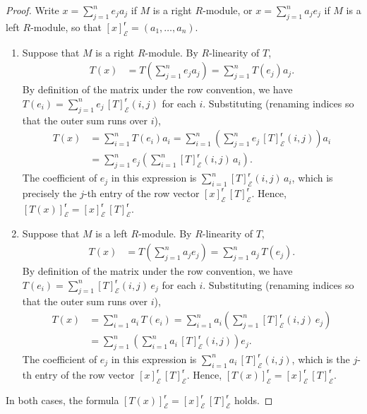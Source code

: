 \begin{proof}
    Write $x = \sum_{j=1}^n e_j a_j$ if $M$ is a right $R$-module, or $x = \sum_{j=1}^n a_j e_j$ if $M$ is a left $R$-module, so that $[x]_\mathcal{E}^{\mathsf{r}} = (a_1,\ldots,a_n)$.

    \begin{enumerate}
        \item Suppose that $M$ is a right $R$-module. By $R$-linearity of $T$,
        \begin{align*}
            T(x) &= T\!\left( \sum_{j=1}^n e_j a_j \right)
                  = \sum_{j=1}^n T(e_j) a_j.
        \end{align*}
        By definition of the matrix under the row convention, we have $T(e_i) = \sum_{j=1}^n e_j \, [T]_\mathcal{E}^{\mathsf{r}}(i,j)$ for each $i$. Substituting (renaming indices so that the outer sum runs over $i$),
        \begin{align*}
            T(x) &= \sum_{i=1}^n T(e_i) a_i
                  = \sum_{i=1}^n \left( \sum_{j=1}^n e_j \, [T]_\mathcal{E}^{\mathsf{r}}(i,j) \right) a_i \\
                &= \sum_{j=1}^n e_j \left( \sum_{i=1}^n [T]_\mathcal{E}^{\mathsf{r}}(i,j) \, a_i \right).
        \end{align*}
        The coefficient of $e_j$ in this expression is $\sum_{i=1}^n [T]_\mathcal{E}^{\mathsf{r}}(i,j) \, a_i$, which is precisely the $j$-th entry of the row vector $[x]_\mathcal{E}^{\mathsf{r}} \, [T]_\mathcal{E}^{\mathsf{r}}$. Hence, $[T(x)]_\mathcal{E}^{\mathsf{r}} = [x]_\mathcal{E}^{\mathsf{r}} \, [T]_\mathcal{E}^{\mathsf{r}}$.

        \item Suppose that $M$ is a left $R$-module. By $R$-linearity of $T$,
        \begin{align*}
            T(x) &= T\!\left( \sum_{j=1}^n a_j e_j \right)
                  = \sum_{j=1}^n a_j \, T(e_j).
        \end{align*}
        By definition of the matrix under the row convention, we have $T(e_i) = \sum_{j=1}^n [T]_\mathcal{E}^{\mathsf{r}}(i,j) \, e_j$ for each $i$. Substituting (renaming indices so that the outer sum runs over $i$),
        \begin{align*}
            T(x) &= \sum_{i=1}^n a_i \, T(e_i)
                  = \sum_{i=1}^n a_i \left( \sum_{j=1}^n [T]_\mathcal{E}^{\mathsf{r}}(i,j) \, e_j \right) \\
                &= \sum_{j=1}^n \left( \sum_{i=1}^n a_i \, [T]_\mathcal{E}^{\mathsf{r}}(i,j) \right) e_j.
        \end{align*}
        The coefficient of $e_j$ in this expression is $\sum_{i=1}^n a_i \, [T]_\mathcal{E}^{\mathsf{r}}(i,j)$, which is the $j$-th entry of the row vector $[x]_\mathcal{E}^{\mathsf{r}} \, [T]_\mathcal{E}^{\mathsf{r}}$. Hence, $[T(x)]_\mathcal{E}^{\mathsf{r}} = [x]_\mathcal{E}^{\mathsf{r}} \, [T]_\mathcal{E}^{\mathsf{r}}$.
    \end{enumerate}

    In both cases, the formula $[T(x)]_\mathcal{E}^{\mathsf{r}} = [x]_\mathcal{E}^{\mathsf{r}} \, [T]_\mathcal{E}^{\mathsf{r}}$ holds.
\end{proof}
